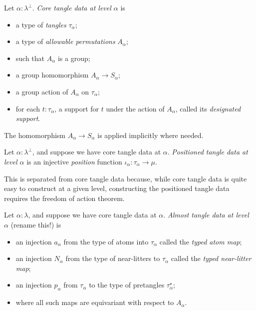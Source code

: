 \documentclass{article}
\begin{document}
\begin{definition}
    Let \( \alpha : \lambda^\bot \).
    \emph{Core tangle data at level \( \alpha \)} is
    \begin{itemize}
        \item a type of \emph{tangles} \( \tau_\alpha \);
        \item a type of \emph{allowable permutations} \( A_\alpha \);
        \item such that \( A_\alpha \) is a group;
        \item a group homomorphism \( A_\alpha \to S_\alpha \);
        \item a group action of \( A_\alpha \) on \( \tau_\alpha \);
        \item for each \( t : \tau_\alpha \), a support for \( t \) under the action of \( A_\alpha \), called its \emph{designated support}.
    \end{itemize}
\end{definition}
\begin{remark}
    The homomorphism \( A_\alpha \to S_\alpha \) is applied implicitly where needed.
\end{remark}
\begin{definition}
    Let \( \alpha : \lambda^\bot \), and suppose we have core tangle data at \( \alpha \).
    \emph{Positioned tangle data at level \( \alpha \)} is an injective \emph{position} function \( \iota_\alpha \colon \tau_\alpha \to \mu \).
\end{definition}
\begin{remark}
    This is separated from core tangle data because, while core tangle data is quite easy to construct at a given level, constructing the positioned tangle data requires the freedom of action theorem.
\end{remark}
\begin{definition}
    Let \( \alpha : \lambda \), and suppose we have core tangle data at \( \alpha \).
    \emph{Almost tangle data at level \( \alpha \)} (rename this!) is
    \begin{itemize}
        \item an injection \( a_\alpha \) from the type of atoms into \( \tau_\alpha \) called the \emph{typed atom map};
        \item an injection \( N_\alpha \) from the type of near-litters to \( \tau_\alpha \) called the \emph{typed near-litter map};
        \item an injection \( p_\alpha \) from \( \tau_\alpha \) to the type of pretangles \( \tau_\alpha^\star \);
        \item where all such maps are equivariant with respect to \( A_\alpha \).
    \end{itemize}
\end{definition}
\end{document}
